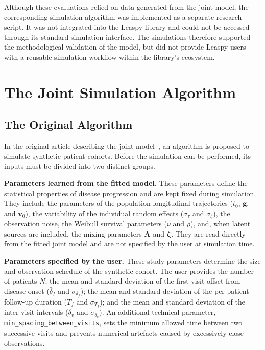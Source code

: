 \documentclass{rapportCS}
\begin{document}
Although these evaluations relied on data generated from the joint model, the corresponding simulation algorithm was implemented as a separate research script. It was not integrated into the Leaspy library and could not be accessed through its standard simulation interface. The simulations therefore supported the methodological validation of the model, but did not provide Leaspy users with a reusable simulation workflow within the library's ecosystem.

\newpage

\section{The Joint Simulation Algorithm}

\subsection{The Original Algorithm}

In the original article describing the joint model~\cite{ortholand2026joint}, an algorithm is proposed to simulate synthetic patient cohorts. Before the simulation can be performed, its inputs must be divided into two distinct groups.

\textbf{Parameters learned from the fitted model.} These parameters define the statistical properties of disease progression and are kept fixed during simulation. They include the parameters of the population longitudinal trajectories ($t_0$, $\mathbf{g}$, and $\mathbf{v}_0$), the variability of the individual random effects ($\sigma_\tau$ and $\sigma_\xi$), the observation noise, the Weibull survival parameters ($\nu$ and $\rho$), and, when latent sources are included, the mixing parameters $\mathbf{A}$ and $\boldsymbol{\zeta}$. They are read directly from the fitted joint model and are not specified by the user at simulation time.

\textbf{Parameters specified by the user.} These study parameters determine the size and observation schedule of the synthetic cohort. The user provides the number of patients $N$; the mean and standard deviation of the first-visit offset from disease onset ($\bar{\delta}_f$ and $\sigma_{\delta_f}$); the mean and standard deviation of the per-patient follow-up duration ($\overline{T_f}$ and $\sigma_{T_f}$); and the mean and standard deviation of the inter-visit intervals ($\bar{\delta}_v$ and $\sigma_{\delta_v}$). An additional technical parameter, \texttt{min\_spacing\_between\_visits}, sets the minimum allowed time between two successive visits and prevents numerical artefacts caused by excessively close observations.
\end{document}
